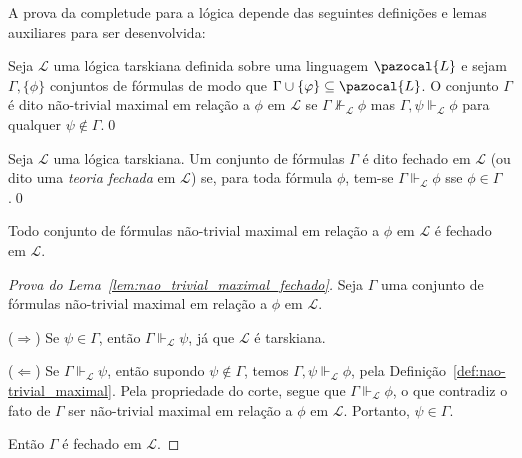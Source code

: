     A prova da completude para a lógica \lfium{} depende das seguintes definições e lemas auxiliares para ser desenvolvida:

    \begin{definicao}\label{def:nao-trivial_maximal}
        Seja $\mathcal{L}$ uma lógica tarskiana definida sobre uma linguagem $\pazocal{L}$ e sejam $\Gamma, \{\phi\}$ conjuntos de fórmulas de modo que $\Gamma \cup \{\phi\} \subseteq \pazocal{L}$. O conjunto $\Gamma$ é dito não-trivial maximal em relação a $\phi$ em $\mathcal{L}$ se $\Gamma \nVdash_{\mathcal{L}} \phi$ mas $\Gamma, \psi \Vdash_{\mathcal{L}} \phi$ para qualquer $\psi \notin \Gamma$.\qed{}
    \end{definicao}

    \begin{definicao}\label{def:fechada}

        Seja $\mathcal{L}$ uma lógica tarskiana. Um conjunto de fórmulas $\Gamma$ é dito fechado em $\mathcal{L}$ (ou dito uma \textit{teoria fechada} em $\mathcal{L}$) se, para toda fórmula $\phi$, tem-se $\Gamma \Vdash_{\mathcal{L}} \phi$ sse $\phi \in \Gamma$.\qed{}
    \end{definicao}

    \begin{lema}\label{lem:nao_trivial_maximal_fechado}
        Todo conjunto de fórmulas não-trivial maximal em relação a $\phi$ em $\mathcal{L}$ é fechado em $\mathcal{L}$.
    \end{lema}

    \begin{proof}[Prova do Lema~\ref{lem:nao_trivial_maximal_fechado}]
        Seja $\Gamma$ uma conjunto de fórmulas não-trivial maximal em relação a $\phi$ em $\mathcal{L}$. 
        
        \noindent($\Longrightarrow$) Se $\psi \in \Gamma$, então $\Gamma \Vdash_{\mathcal{L}} \psi$, já que $\mathcal{L}$ é tarskiana. 
        
        \noindent($\Longleftarrow$) Se $\Gamma \Vdash_{\mathcal{L}} \psi$, então supondo $\psi \notin \Gamma$, temos $\Gamma, \psi \Vdash_{\mathcal{L}} \phi$, pela Definição~\ref{def:nao-trivial_maximal}. Pela propriedade do corte, segue que $\Gamma \Vdash_{\mathcal{L}} \phi$, o que contradiz o fato de $\Gamma$ ser não-trivial maximal em relação a $\phi$ em $\mathcal{L}$. Portanto, $\psi \in \Gamma$.
        
        Então $\Gamma$ é fechado em $\mathcal{L}$.
    \end{proof}


